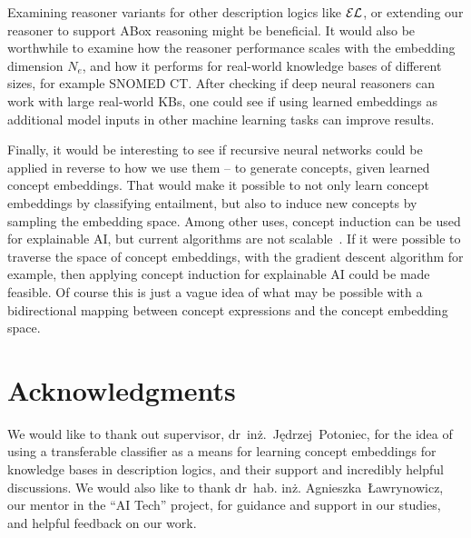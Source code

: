 Examining reasoner variants for other description logics like $\mathcal{EL}$, or extending our reasoner to support ABox reasoning might be beneficial.
It would also be worthwhile to examine how the reasoner performance scales with the embedding dimension $N_e$, and how it performs for real-world knowledge bases of different sizes, for example SNOMED CT.
After checking if deep neural reasoners can work with large real-world KBs, one could see if using learned embeddings as additional model inputs in other machine learning tasks can improve results.

Finally, it would be interesting to see if recursive neural networks could be applied in reverse to how we use them -- to generate concepts, given learned concept embeddings.
That would make it possible to not only learn concept embeddings by classifying entailment, but also to induce new concepts by sampling the embedding space.
Among other uses, concept induction can be used for explainable AI, but current algorithms are not scalable~\cite{sarker_efficient_2019}.
If it were possible to traverse the space of concept embeddings, with the gradient descent algorithm for example, then applying concept induction for explainable AI could be made feasible.
Of course this is just a vague idea of what may be possible with a bidirectional mapping between concept expressions and the concept embedding space.

\section{Acknowledgments}

We would like to thank out supervisor, dr~inż.~Jędrzej~Potoniec, for the idea of using a transferable classifier as a means for learning concept embeddings for knowledge bases in description logics, and their support and incredibly helpful discussions. We would also like to thank dr~hab. inż. Agnieszka~Ławrynowicz, our mentor in the ``AI Tech'' project, for guidance and support in our studies, and helpful feedback on our work.